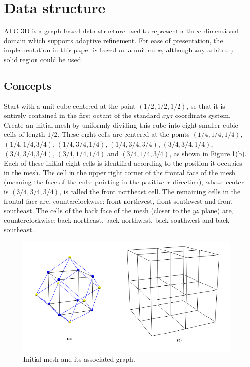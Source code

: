 \section{Data structure}
ALG-3D is a graph-based data structure used to represent a
three-dimensional domain which supports adaptive refinement. For
ease of presentation, the implementation in this paper is based on a
unit cube, although any arbitrary solid region could be used.

\subsection{Concepts}
Start with a unit cube centered at the point $(1/2,1/2,1/2)$, so
that it is entirely contained in the first octant of the standard
$xyz$ coordinate system. Create an initial mesh by uniformly
dividing this cube into eight smaller cubic cells of length $1/2$.
These eight cells are centered at the points $(1/4,1/4,1/4)$,
$(1/4,1/4,3/4)$, $(1/4,3/4,1/4)$, $(1/4,3/4,3/4)$, $(3/4,3/4,1/4)$,
$(3/4,3/4,3/4)$, $(3/4,1/4,1/4)$ and $(3/4,1/4,3/4)$, as shown in
Figure \ref{FIG_INITIAL_GRAPH_MESH}(b). Each of these initial eight
cells is identified according to the position it occupies in the
mesh. The cell in the upper right corner of the frontal face of the
mesh (meaning the face of the cube pointing in the positive
$x$-direction), whose center is $(3/4,3/4,3/4)$, is called the front
northeast cell. The remaining cells in the frontal face are,
counterclockwise: front northwest, front southwest and front
southeast. The cells of the back face of the mesh (closer to the
$yz$ plane) are, counterclockwise: back northeast, back northwest,
back southwest and back southeast.

\begin{figure}[!ht]
    \centering
    \includegraphics[scale=0.37,angle=0]{../img/initialGraphAndGrid.jpg}
    \caption{Initial mesh and its associated graph.}
    \label{FIG_INITIAL_GRAPH_MESH}
\end{figure}


